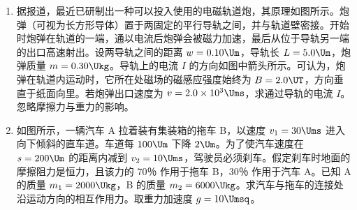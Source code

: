 \documentclass[\gkver]{gaokaozhenti}
\begin{document}
\begin{enumerate}
\begin{enumerate}
	对此方案有以下几种评论意见：

	（A）方案正确可行。

	（B）方案的理论依据正确，但利用所给的器材无法确定小车在斜面上是否做匀速运动。

	（C）方案的理论依据有问题，小车所受摩擦力与斜面倾角有关。

	其中合理的意见是。
\end{enumerate}

\onepicture[align=right, w=6.85cm]{}



\item
据报道，最近已研制出一种可以投入使用的电磁轨道炮，其原理如图所示。炮弹（可视为长方形导体）置于两固定的平行导轨之间，并与轨道壁密接。开始时炮弹在轨道的一端，通以电流后炮弹会被磁力加速，最后从位于导轨另一端的出口高速射出。设两导轨之间的距离 $w=0.10\Um$，导轨长 $L=5.0\Um$，炮弹质量 $m=0.30\Ukg$。导轨上的电流 $I$ 的方向如图中箭头所示。可认为，炮弹在轨道内运动时，它所在处磁场的磁感应强度始终为 $B=2.0\UT$，方向垂直于纸面向里。若炮弹出口速度为 $v=2.0\times10^{3}\Ums$，求通过导轨的电流 $I$。忽略摩擦力与重力的影响。

\onepicture[align=right, w=4.76cm]{}



\item
如图所示，一辆汽车 A 拉着装有集装箱的拖车 B，以速度 $v_{1}=30\Ums$ 进入向下倾斜的直车道。车道每 $100\Um$ 下降 $2\Um$。为了使汽车速度在 $s=200\Um$ 的距离内减到 $v_{2}=10\Ums$，驾驶员必须刹车。假定刹车时地面的摩擦阻力是恒力，且该力的 70％ 作用于拖车 B，30％ 作用于汽车 A。已知 A 的质量 $m_{1}=2000\Ukg$，B 的质量 $m_{2}=6000\Ukg$。求汽车与拖车的连接处沿运动方向的相互作用力。取重力加速度 $g=10\Umsq$。


\end{enumerate}
\end{document}
